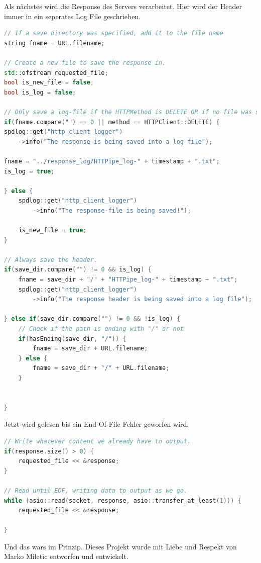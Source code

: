 \documentclass{article}
\begin{document}
\noindent Als nächstes wird die Response des Servers verarbeitet.
Hier wird der Header immer in ein seperates Log File geschrieben.
\begin{lstlisting}[language=C++]
// If a save directory was specified, add it to the file name
string fname = URL.filename;

// Create a new file to save the response in. 
std::ofstream requested_file;
bool is_new_file = false;
bool is_log = false;

// Only save a log-file if the HTTPMethod is DELETE OR if no file was sent.
if(fname.compare("") == 0 || method == HTTPClient::DELETE) {
spdlog::get("http_client_logger")
    ->info("The response is being saved into a log-file");

fname = "../response_log/HTTPipe_log-" + timestamp + ".txt";
is_log = true;

} else {
    spdlog::get("http_client_logger")
        ->info("The response-file is being saved!");
    
    is_new_file = true;
}

// Always save the header.
if(save_dir.compare("") != 0 && is_log) {
    fname = save_dir + "/" + "HTTPipe_log-" + timestamp + ".txt";
    spdlog::get("http_client_logger")
        ->info("The response header is being saved into a log file");

} else if(save_dir.compare("") != 0 && !is_log) {
    // Check if the path is ending with "/" or not
    if(hasEnding(save_dir, "/")) {
        fname = save_dir + URL.filename;
    } else {
        fname = save_dir + "/" + URL.filename;
    }


}
\end{lstlisting}

Jetzt wird gelesen bis ein End-Of-File Fehler geworfen wird.
\begin{lstlisting}[language=C++]
// Write whatever content we already have to output.
if(response.size() > 0) {
    requested_file << &response;
}

// Read until EOF, writing data to output as we go.
while (asio::read(socket, response, asio::transfer_at_least(1))) {
    requested_file << &response;

}
\end{lstlisting}

\noindent Und das wars im Prinzip. Dieses Projekt wurde mit Liebe und Respekt von Marko Miletic entworfen und entwickelt.




\end{document}
